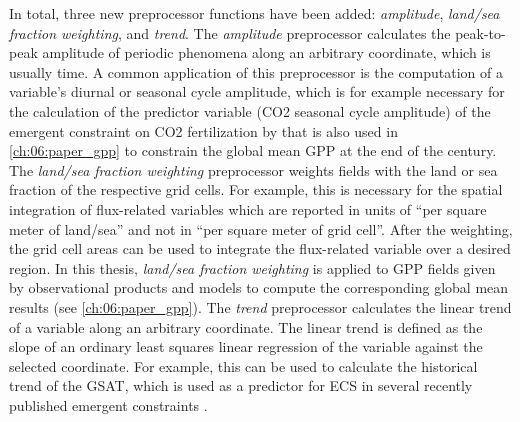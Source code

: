 In total, three new preprocessor functions have been added: \emph{amplitude},
\emph{land/sea fraction weighting}, and \emph{trend}. The \emph{amplitude}
preprocessor calculates the peak-to-peak amplitude of periodic phenomena along
an arbitrary coordinate, which is usually time. A common application of this
preprocessor is the computation of a variable's diurnal or seasonal cycle
amplitude, which is for example necessary for the calculation of the predictor
variable (\ac{CO2} seasonal cycle amplitude) of the emergent constraint on
\ac{CO2} fertilization by \textcite{Wenzel2016} that is also used in
\cref{ch:06:paper_gpp} to constrain the global mean \ac{GPP} at the end of the
 century. The \emph{land/sea fraction weighting} preprocessor weights
fields with the land or sea fraction of the respective grid cells. For example,
this is necessary for the spatial integration of flux-related variables which
are reported in units of \enquote{per square meter of land/sea} and not in
\enquote{per square meter of grid cell}. After the weighting, the grid cell
areas can be used to integrate the flux-related variable over a desired region.
In this thesis, \emph{land/sea fraction weighting} is applied to \ac{GPP}
fields given by observational products and models to compute the corresponding
global mean results (see \cref{ch:06:paper_gpp}). The \emph{trend} preprocessor
calculates the linear trend of a variable along an arbitrary coordinate. The
linear trend is defined as the slope of an ordinary least squares linear
regression of the variable against the selected coordinate. For example, this
can be used to calculate the historical trend of the \ac{GSAT}, which is used
as a predictor for \ac{ECS} in several recently published emergent constraints
\autocite{JimenezdelaCuesta2019, Nijsse2020, Tokarska2020}.

